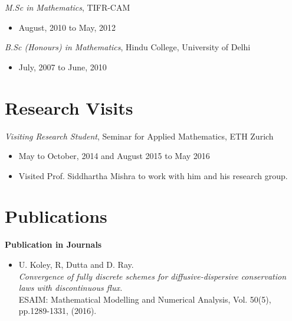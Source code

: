 \documentclass[margin]{res}
\begin{document}
\begin{resume}
 {\it M.Sc in Mathematics}, TIFR-CAM
 \begin{itemize} \itemsep -2pt  %
 \item August, 2010 to May, 2012
 \end{itemize}
 
 {\it B.Sc (Honours) in Mathematics}, Hindu College, University of Delhi
 \begin{itemize} \itemsep -2pt  %
 \item July, 2007 to June, 2010
 \end{itemize}
 
% 

\section{Research Visits}
 {\it Visiting Research Student}, Seminar for Applied Mathematics, ETH Zurich
 \begin{itemize} \itemsep -2pt  %
 \item May to October, 2014 and August 2015 to May 2016            
 \item Visited Prof. Siddhartha Mishra to work with him and his research group.
 \end{itemize}

 \section{Publications}

\textbf{Publication in Journals}                
            \begin{itemize}            
             \item U. Koley, R, Dutta and D. Ray. \\
              {\it Convergence of fully discrete schemes for diffusive-dispersive conservation laws with discontinuous flux.}\\
              ESAIM: Mathematical Modelling and Numerical Analysis, Vol. 50(5), pp.1289-1331, (2016).
              

\end{itemize}
\end{resume}
\end{document}
